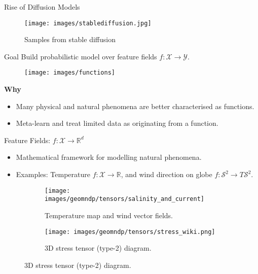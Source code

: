 \begin{frame}{Rise of Diffusion Models}
\begin{figure}
\texttt{[image: images/stablediffusion.jpg]}
\caption{Samples from stable diffusion}
\end{figure}
\end{frame}

\begin{frame}{Goal}
{Build probabilistic model over feature fields $f: \mathcal{X} \rightarrow \mathcal{Y}$.}
\begin{figure}
\texttt{[image: images/functions]}
\end{figure}
\pause
\vspace{-5mm}
\textbf{Why}
\begin{itemize}
    \item Many physical and natural phenomena are better characterised as functions.
    \item Meta-learn and treat limited data as originating from a function.
\end{itemize}
\end{frame}

\begin{frame}{Feature Fields: $f: \mathcal{X} \rightarrow \mathbb{R}^d$}

\begin{itemize}
    \item Mathematical framework for modelling natural phenomena.
    \item Examples: Temperature $f:\mathcal{X}\rightarrow\mathbb{R}$,
    and wind direction on globe $f:\mathcal{S}^2\rightarrow T\mathcal{S}^2$.
\end{itemize}

    \begin{figure}
        \centering
        \begin{subfigure}{0.45\textwidth}
            \centering
            \texttt{[image: images/geomndp/tensors/salinity\_and\_current]}
            \caption{Temperature map and wind vector fields.}
        \end{subfigure}
        \hfill
        \begin{subfigure}{0.45\textwidth}
            \centering
            \texttt{[image: images/geomndp/tensors/stress\_wiki.png]}
            \caption{3D stress tensor (type-2) diagram.}
        \end{subfigure}
    \end{figure}
\end{frame}

